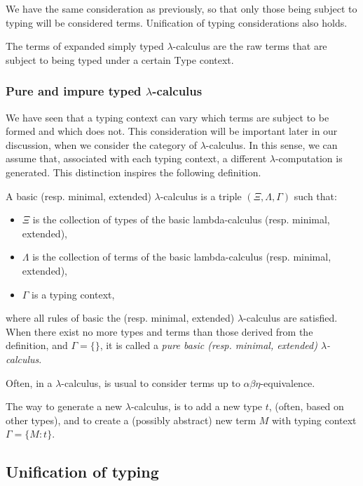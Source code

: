 We have the same consideration as previously, so that only those being subject to typing will be considered terms. Unification of typing considerations also holds.
\begin{definition}
  The terms of expanded simply typed $\lambda$-calculus are the raw terms that are subject to being typed under a certain Type context.
\end{definition}
\subsubsection{Pure and impure typed $\lambda$-calculus}

We have seen that a typing context can vary which terms are subject to be formed and which does not. This consideration will be important later in our discussion, when we consider the category of $\lambda$-calculus. In this sense, we can assume that, associated with each typing context, a different $\lambda$-computation is generated. This distinction inspires the following definition.


\begin{definition}
  A basic (resp. minimal, extended) $\lambda$-calculus is a triple $(\Xi, \Lambda, \Gamma)$ such that:
  \begin{itemize}
  \item $\Xi$ is the collection of types of the basic lambda-calculus (resp. minimal, extended),
  \item $\Lambda$ is the collection of terms of the basic lambda-calculus (resp. minimal, extended),
  \item $\Gamma$ is a typing context,
  \end{itemize}
  where all rules of basic the (resp. minimal, extended) $\lambda$-calculus are satisfied. When there
  exist no more types and terms than those derived from the definition, and $\Gamma=\{\}$, it is called a \emph{pure basic (resp. minimal, extended) $\lambda$-calculus}.   
\end{definition}
\begin{remark}
  Often, in a $\lambda$-calculus, is usual to consider terms up to $\alpha\beta\eta$-equivalence. 
\end{remark}

The way to generate a new $\lambda$-calculus, is to add a new type $t$, (often, based on other types), and to create a (possibly abstract) new term $M$ with typing context $\Gamma = \{M:t\}$.
\subsection{Unification of typing}

